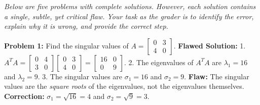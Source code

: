 \documentclass[11pt, letterpaper]{article}
\theoremstyle{definition}
\theoremstyle{remark}
\begin{document}
\textit{Below are five problems with complete solutions. However, each solution contains a single, subtle, yet critical flaw. Your task as the grader is to identify the error, explain why it is wrong, and provide the correct step.}

\vspace{1em}
\textbf{Problem 1:} Find the singular values of $A = \begin{bmatrix} 0 & 3 \\ 4 & 0 \end{bmatrix}$.
\textbf{Flawed Solution:}
1. $A^TA = \begin{bmatrix} 0 & 4 \\ 3 & 0 \end{bmatrix} \begin{bmatrix} 0 & 3 \\ 4 & 0 \end{bmatrix} = \begin{bmatrix} 16 & 0 \\ 0 & 9 \end{bmatrix}$.
2. The eigenvalues of $A^TA$ are $\lambda_1 = 16$ and $\lambda_2 = 9$.
3. The singular values are $\sigma_1 = 16$ and $\sigma_2 = 9$.
\textbf{Flaw:} The singular values are the \textit{square roots} of the eigenvalues, not the eigenvalues themselves.
\textbf{Correction:} $\sigma_1 = \sqrt{16} = 4$ and $\sigma_2 = \sqrt{9} = 3$.
\end{document}
